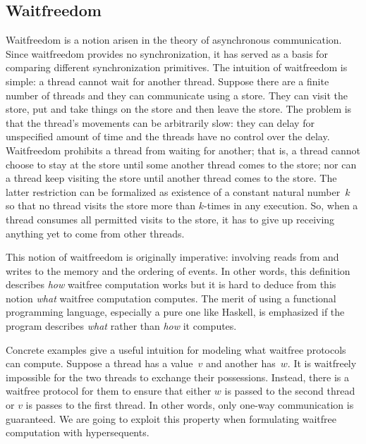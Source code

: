 
\subsection{Waitfreedom}
\label{subsect:wf}

Waitfreedom is a notion arisen in the theory of asynchronous
communication. Since waitfreedom provides no synchronization, it has
served as a basis for comparing different synchronization primitives.
The intuition of waitfreedom is simple: a thread cannot
wait for another thread.  Suppose there are a finite number of threads and they can
communicate using a store. They can
visit the store, put and take things on the store and then leave the
store. The problem is that the thread's movements can be arbitrarily
slow: they can delay for unspecified amount of time and the threads
have no control over the delay. Waitfreedom prohibits a thread from
waiting for another; that is, a thread cannot choose to stay at the
store until some another thread comes to the store; nor can a thread
keep visiting the store until another thread comes to the store.  The
latter restriction can be formalized as existence of a constant natural
number~$k$ so
that no thread visits the store more than
$k$-times in any execution.  So, when a thread consumes all permitted
visits to the store, it has to give up receiving anything yet to come
from
other threads.

This notion of waitfreedom is originally imperative: involving reads from and writes to
the memory and the ordering of events.  In other words, this definition
describes \textit{how} waitfree computation works but it is hard to deduce from
this notion \textit{what} waitfree computation computes.
The merit of using a functional programming language, especially a pure
one like Haskell, is emphasized if the program describes \textit{what}
rather than \textit{how} it computes.

Concrete examples give a useful intuition for modeling what waitfree
protocols can compute.
Suppose a thread has a value~$v$ and another has~$w$.
It is waitfreely impossible for the two threads to exchange their
possessions.  Instead, there is a waitfree protocol for them to ensure
that either $w$ is passed to the second thread or $v$ is passes to the
first thread.
In other words, only one-way communication is guaranteed.  We are going
to exploit this property when formulating waitfree computation with hypersequents.


